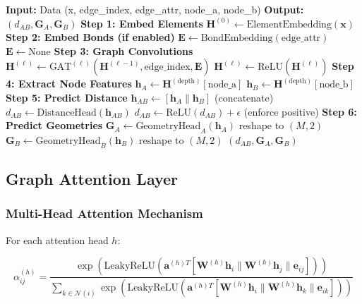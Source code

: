 \documentclass[11pt,a4paper]{article}
\begin{document}
\begin{algorithm}
\caption{LocalGeometryGCN Forward}
\begin{algorithmic}[1]
\State \textbf{Input:} Data (x, edge\_index, edge\_attr, node\_a, node\_b)
\State \textbf{Output:} $(d_{AB}, \mathbf{G}_A, \mathbf{G}_B)$
\State
\State \textbf{Step 1: Embed Elements}
\State $\mathbf{H}^{(0)} \gets \text{ElementEmbedding}(\mathbf{x})$
\State
\State \textbf{Step 2: Embed Bonds (if enabled)}
    \State $\mathbf{E} \gets \text{BondEmbedding}(\text{edge\_attr})$
\Else
    \State $\mathbf{E} \gets \text{None}$
\EndIf
\State
\State \textbf{Step 3: Graph Convolutions}
    \State $\mathbf{H}^{(\ell)} \gets \text{GAT}^{(\ell)}(\mathbf{H}^{(\ell-1)}, \text{edge\_index}, \mathbf{E})$
    \State $\mathbf{H}^{(\ell)} \gets \text{ReLU}(\mathbf{H}^{(\ell)})$
\EndFor
\State
\State \textbf{Step 4: Extract Node Features}
\State $\mathbf{h}_A \gets \mathbf{H}^{(\text{depth})}[\text{node\_a}]$
\State $\mathbf{h}_B \gets \mathbf{H}^{(\text{depth})}[\text{node\_b}]$
\State
\State \textbf{Step 5: Predict Distance}
\State $\mathbf{h}_{AB} \gets [\mathbf{h}_A \| \mathbf{h}_B]$ (concatenate)
\State $d_{AB} \gets \text{DistanceHead}(\mathbf{h}_{AB})$
\State $d_{AB} \gets \text{ReLU}(d_{AB}) + \epsilon$ (enforce positive)
\State
\State \textbf{Step 6: Predict Geometries}
\State $\mathbf{G}_A \gets \text{GeometryHead}_A(\mathbf{h}_A)$ reshape to $(M, 2)$
\State $\mathbf{G}_B \gets \text{GeometryHead}_B(\mathbf{h}_B)$ reshape to $(M, 2)$
\State
\State \Return $(d_{AB}, \mathbf{G}_A, \mathbf{G}_B)$
\end{algorithmic}
\end{algorithm}

\subsection{Graph Attention Layer}

\subsubsection{Multi-Head Attention Mechanism}

For each attention head $h$:

\begin{equation}
\alpha_{ij}^{(h)} = \frac{\exp(\text{LeakyReLU}(\mathbf{a}^{(h)T} [\mathbf{W}^{(h)} \mathbf{h}_i \| \mathbf{W}^{(h)} \mathbf{h}_j \| \mathbf{e}_{ij}]))}{\sum_{k \in \mathcal{N}(i)} \exp(\text{LeakyReLU}(\mathbf{a}^{(h)T} [\mathbf{W}^{(h)} \mathbf{h}_i \| \mathbf{W}^{(h)} \mathbf{h}_k \| \mathbf{e}_{ik}]))}
\end{equation}
\end{document}
